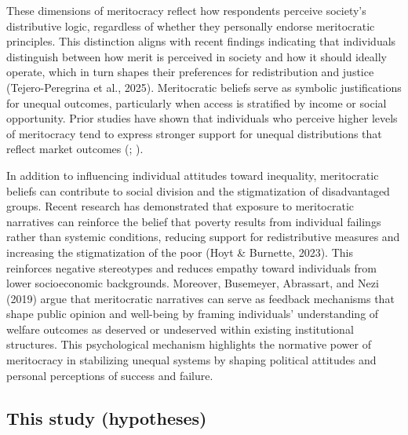 \documentclass[
  12pt,
]{article}
\begin{document}
These dimensions of meritocracy reflect how respondents perceive
society's distributive logic, regardless of whether they personally
endorse meritocratic principles. This distinction aligns with recent
findings indicating that individuals distinguish between how merit is
perceived in society and how it should ideally operate, which in turn
shapes their preferences for redistribution and justice
(Tejero-Peregrina et al., 2025). Meritocratic beliefs serve as symbolic
justifications for unequal outcomes, particularly when access is
stratified by income or social opportunity. Prior studies have shown
that individuals who perceive higher levels of meritocracy tend to
express stronger support for unequal distributions that reflect market
outcomes (; ).

In addition to influencing individual attitudes toward inequality,
meritocratic beliefs can contribute to social division and the
stigmatization of disadvantaged groups. Recent research has demonstrated
that exposure to meritocratic narratives can reinforce the belief that
poverty results from individual failings rather than systemic
conditions, reducing support for redistributive measures and increasing
the stigmatization of the poor (Hoyt \& Burnette, 2023). This reinforces
negative stereotypes and reduces empathy toward individuals from lower
socioeconomic backgrounds. Moreover, Busemeyer, Abrassart, and Nezi
(2019) argue that meritocratic narratives can serve as feedback
mechanisms that shape public opinion and well-being by framing
individuals' understanding of welfare outcomes as deserved or undeserved
within existing institutional structures. This psychological mechanism
highlights the normative power of meritocracy in stabilizing unequal
systems by shaping political attitudes and personal perceptions of
success and failure.

\subsection{This study (hypotheses)}\label{this-study-hypotheses}
\end{document}
